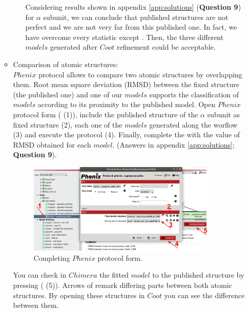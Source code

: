 \begin{itemize}
\begin{itemize}
\begin{itemize}
    Considering results shown in appendix \ref{app:solutions} (\textbf{Question 9}) for  $\alpha$ subunit, we can conclude that published structures are not perfect and we are not very far from this published one. In fact, we have overcome every statistic except \ccmask. Then, the three different $models$ generated after $Coot$ refinement could be acceptable. \\

  \end{itemize}
 
  \item Comparison of atomic structures: \\
  
  $Phenix$ protocol  allows to compare two atomic structures by overlapping them. Root mean square deviation (RMSD) between the fixed structure (the published one) and one of our $models$ supports the classification of $models$ according to its proximity to the published model. Open $Phenix$  protocol form ( (1)), include the published structure of the  $\alpha$ subunit as fixed structure (2), each one of the $models$ generated along the worflow (3) and execute the protocol (4). Finally, complete the  with the value of RMSD obtained for each $model$. (Answers in appendix \ref{app:solutions}; \textbf{Question 9}).
  
  \begin{figure}[H]
    \centering 
    \captionsetup{width=.7\linewidth} 
    \includegraphics[width=0.90\textwidth]{Images/Fig37.png}
    \caption{Completing $Phenix$  protocol form.}
    \label{fig:superpose_pdbs_protocol}
    \end{figure}
    
  You can check in $Chimera$ the fitted $model$ to the published structure by pressing  ( (5)). Arrows of  remark differing parts between both atomic structures. By opening these structures in $Coot$ you can see the difference between them.
 

\end{itemize}
\end{itemize}
